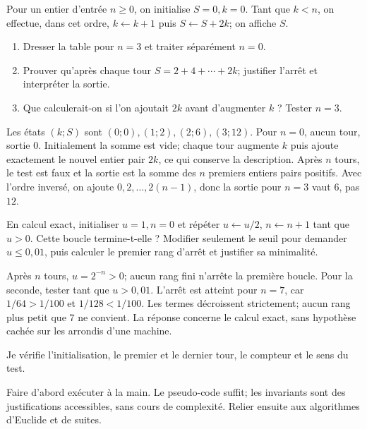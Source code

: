\label{t11s-c07-p01}
Pour un entier d’entrée $n\ge0$, on initialise $S=0,k=0$. Tant que $k<n$, on effectue, dans cet ordre, $k\leftarrow k+1$ puis $S\leftarrow S+2k$; on affiche $S$.
\begin{enumerate}
\item Dresser la table pour $n=3$ et traiter séparément $n=0$.
\item Prouver qu’après chaque tour $S=2+4+\cdots+2k$; justifier l’arrêt et interpréter la sortie.
\item Que calculerait-on si l’on ajoutait $2k$ avant d’augmenter $k$ ? Tester $n=3$.
\end{enumerate}
\begin{corrige}\label{sol-t11s-c07-p01}
Les états $(k;S)$ sont $(0;0),(1;2),(2;6),(3;12)$. Pour $n=0$, aucun tour, sortie $0$. Initialement la somme est vide; chaque tour augmente $k$ puis ajoute exactement le nouvel entier pair $2k$, ce qui conserve la description. Après $n$ tours, le test est faux et la sortie est la somme des $n$ premiers entiers pairs positifs. Avec l’ordre inversé, on ajoute $0,2,\ldots,2(n-1)$, donc la sortie pour $n=3$ vaut $6$, pas $12$.
\end{corrige}
\label{t11s-c07-p02}
En calcul exact, initialiser $u=1,n=0$ et répéter $u\leftarrow u/2$, $n\leftarrow n+1$ tant que $u>0$. Cette boucle termine-t-elle ? Modifier seulement le seuil pour demander $u\le0{,}01$, puis calculer le premier rang d’arrêt et justifier sa minimalité.
\begin{corrige}\label{sol-t11s-c07-p02}
Après $n$ tours, $u=2^{-n}>0$; aucun rang fini n’arrête la première boucle. Pour la seconde, tester tant que $u>0{,}01$. L’arrêt est atteint pour $n=7$, car $1/64>1/100$ et $1/128<1/100$. Les termes décroissent strictement; aucun rang plus petit que $7$ ne convient. La réponse concerne le calcul exact, sans hypothèse cachée sur les arrondis d’une machine.
\end{corrige}

\begin{jemeteste}Je vérifie l’initialisation, le premier et le dernier tour, le compteur et le sens du test.\end{jemeteste}
\begin{notepourlaclasse}Faire d’abord exécuter à la main. Le pseudo-code suffit; les invariants sont des justifications accessibles, sans cours de complexité. Relier ensuite aux algorithmes d’Euclide et de suites.\end{notepourlaclasse}
